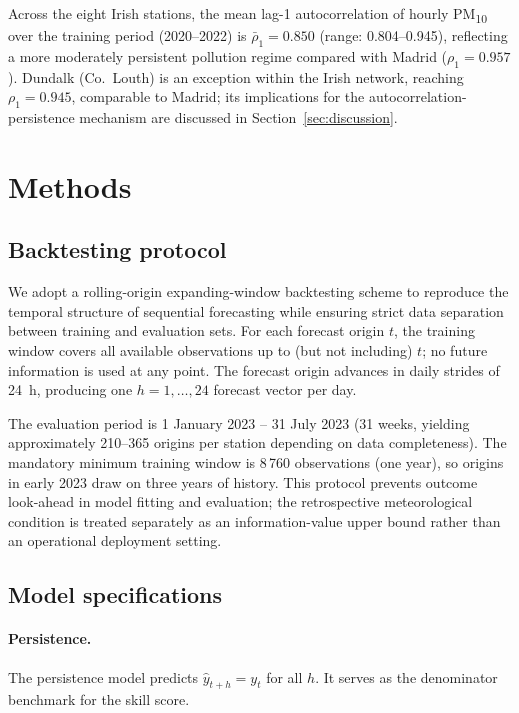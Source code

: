 \documentclass[12pt,a4paper]{article}
\newcommand{\PMten}{PM\textsubscript{10}}
\begin{document}
Across the eight Irish stations, the mean lag-1 autocorrelation of hourly
\PMten{} over the training period (2020--2022) is $\bar{\rho}_1 = 0.850$
(range: 0.804--0.945), reflecting a more moderately persistent pollution
regime compared with Madrid ($\rho_1 = 0.957$).  Dundalk (Co.\ Louth) is an
exception within the Irish network, reaching $\rho_1 = 0.945$, comparable to
Madrid; its implications for the autocorrelation-persistence mechanism are
discussed in Section~\ref{sec:discussion}.

\section{Methods}
\label{sec:methods}

\subsection{Backtesting protocol}

We adopt a rolling-origin expanding-window backtesting scheme to reproduce
the temporal structure of sequential forecasting while ensuring strict data separation between training
and evaluation sets.  For each forecast origin $t$, the training window covers
all available observations up to (but not including) $t$; no future information
is used at any point.  The forecast origin advances in daily strides of 24~h,
producing one $h = 1, \ldots, 24$ forecast vector per day.

The evaluation period is 1 January 2023 -- 31 July 2023 (31 weeks, yielding
approximately 210--365 origins per station depending on data completeness).
The mandatory minimum training window is 8\,760 observations (one year), so
origins in early 2023 draw on three years of history.  This protocol prevents outcome look-ahead in model fitting and evaluation; the retrospective meteorological condition is treated separately as an information-value upper bound rather than an operational deployment setting.

\subsection{Model specifications}

\paragraph{Persistence.}
The persistence model predicts $\hat{y}_{t+h} = y_t$ for all $h$.  It serves
as the denominator benchmark for the skill score.
\end{document}
